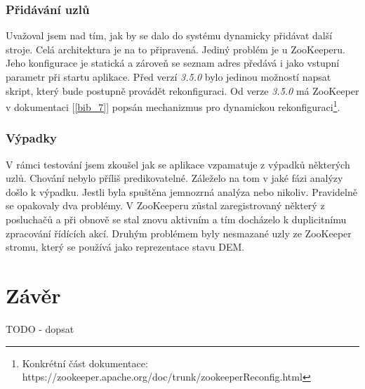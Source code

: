 \documentclass[
  digital, %
  table,   %
  nolof,     %
  nolot,     %
  oneside, %
  nocover,
  monochrome,
  12pt
]{fithesis3}
\begin{document}
\subsection*{Přidávání uzlů}
Uvažoval jsem nad tím, jak by se dalo do systému dynamicky přidávat další stroje. Celá architektura je na to připravená. Jediný problém je u ZooKeeperu. Jeho konfigurace je statická a zároveň se seznam adres předává i jako vstupní parametr při startu aplikace. Před verzí \textit{3.5.0} bylo jedinou možností napsat skript, který bude postupně provádět rekonfiguraci. Od verze \textit{3.5.0} má ZooKeeper v dokumentaci [\ref{bib_7}] popsán mechanizmus pro dynamickou rekonfiguraci\footnote{Konkrétní část dokumentace: \\
https://zookeeper.apache.org/doc/trunk/zookeeperReconfig.html}.

\subsection*{Výpadky}
V rámci testování jsem zkoušel jak se aplikace vzpamatuje z výpadků některých uzlů. Chování nebylo příliš predikovatelné. Záleželo na tom v jaké fázi analýzy došlo k výpadku. Jestli byla spuštěna jemnozrná analýza nebo nikoliv. Pravidelně se opakovaly dva problémy. V ZooKeeperu zůstal zaregistrovaný některý z posluchačů a při obnově se stal znovu aktivním a tím docházelo k duplicitnímu zpracování řídících akcí. Druhým problémem byly nesmazané uzly ze ZooKeeper stromu, který se používá jako reprezentace stavu DEM.

\chapter{Závěr}
TODO - dopsat

\end{document}
